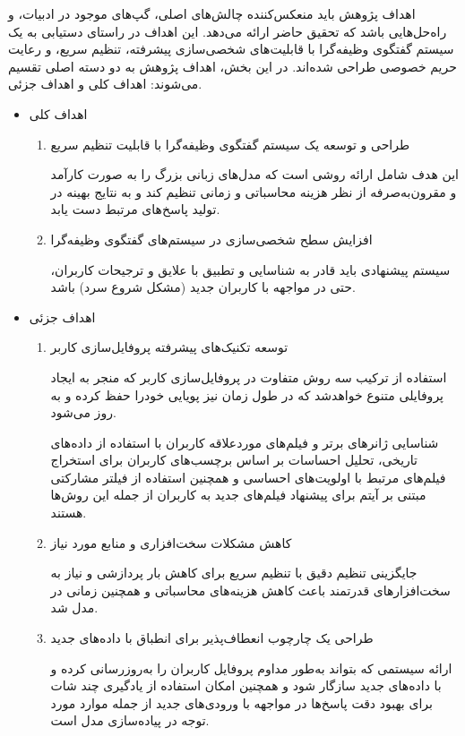اهداف پژوهش باید منعکس‌کننده چالش‌های اصلی، گپ‌های موجود در ادبیات، و راه‌حل‌هایی باشد که تحقیق حاضر ارائه می‌دهد. این اهداف در راستای دستیابی به یک سیستم گفتگوی وظیفه‌گرا با قابلیت‌های شخصی‌سازی پیشرفته، تنظیم سریع، و رعایت حریم خصوصی طراحی شده‌اند. در این بخش، اهداف پژوهش به دو دسته اصلی تقسیم می‌شوند: اهداف کلی و اهداف جزئی.

\begin{itemize}
\item
اهداف کلی
\begin{enumerate}
\item
طراحی و توسعه یک سیستم گفتگوی وظیفه‌گرا با قابلیت تنظیم سریع

این هدف شامل ارائه روشی است که مدل‌های زبانی بزرگ را به صورت کارآمد و مقرون‌به‌صرفه از نظر هزینه محاسباتی و زمانی تنظیم کند و به نتایج بهینه در تولید پاسخ‌های مرتبط دست یابد.
\item

افزایش سطح شخصی‌سازی در سیستم‌های گفتگوی وظیفه‌گرا

سیستم پیشنهادی باید قادر به شناسایی و تطبیق با علایق و ترجیحات کاربران، حتی در مواجهه با کاربران جدید (مشکل شروع سرد) باشد.
\end{enumerate}

\item
اهداف جزئی

\begin{enumerate}
\item
توسعه تکنیک‌های پیشرفته پروفایل‌سازی کاربر

استفاده از ترکیب سه روش متفاوت در پروفایل‌سازی کاربر که منجر به ایجاد پروفایلی متنوع خواهدشد که در طول زمان نیز پویایی خودرا حفظ کرده و به روز می‌شود.

شناسایی ژانرهای برتر و فیلم‌های موردعلاقه کاربران با استفاده از داده‌های تاریخی، تحلیل احساسات بر اساس برچسب‌های کاربران برای استخراج فیلم‌های مرتبط با اولویت‌های احساسی و همچنین استفاده از فیلتر مشارکتی مبتنی بر آیتم برای پیشنهاد فیلم‌های جدید به کاربران از جمله این روش‌ها هستند.

\item
کاهش مشکلات سخت‌افزاری و منابع مورد نیاز

جایگزینی تنظیم دقیق با تنظیم سریع برای کاهش بار پردازشی و نیاز به سخت‌افزارهای قدرتمند باعث کاهش هزینه‌های محاسباتی و همچنین زمانی در مدل شد.

\item
طراحی یک چارچوب انعطاف‌پذیر برای انطباق با داده‌های جدید

ارائه سیستمی که بتواند به‌طور مداوم پروفایل کاربران را به‌روزرسانی کرده و با داده‌های جدید سازگار شود و همچنین امکان استفاده از یادگیری چند شات برای بهبود دقت پاسخ‌ها در مواجهه با ورودی‌های جدید از جمله موارد مورد توجه در پیاده‌سازی مدل است.



\end{enumerate}
\end{itemize}
